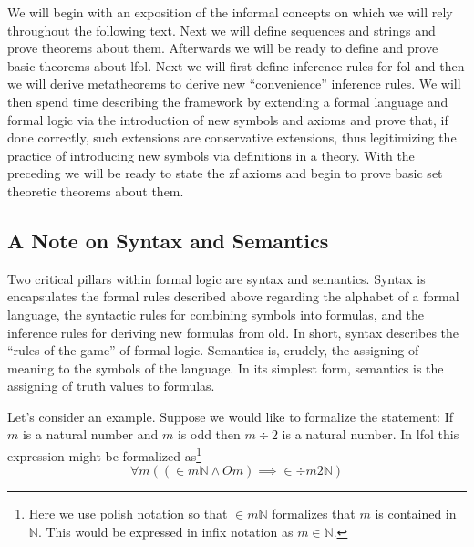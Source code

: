 \documentclass[12pt]{article}
\theoremstyle{break}
\theoremstyle{break}
\theoremstyle{break}
\theoremstyle{break}
\theoremstyle{break}
\newtheorem{informal definition}[definition]{Informal Definition}
\newcommand{\qq}[1]{``#1''}
\begin{document}
We will begin with an exposition of the informal concepts on which we will rely throughout the following text.
Next we will define sequences and strings and prove theorems about them.
Afterwards we will be ready to define and prove basic theorems about \gls{lfol}.
Next we will first define inference rules for \gls{fol} and then we will derive metatheorems to derive new \qq{convenience} inference rules.
We will then spend time describing the framework by extending a formal language and formal logic via the introduction of new symbols and axioms and prove that, if done correctly, such extensions are conservative extensions, thus legitimizing the practice of introducing new symbols via definitions in a theory.
With the preceding we will be ready to state the \gls{zf} axioms and begin to prove basic set theoretic theorems about them.

\subsection{A Note on Syntax and Semantics}

Two critical pillars within formal logic are syntax and semantics.
Syntax is encapsulates the formal rules described above regarding the alphabet of a formal language, the syntactic rules for combining symbols into formulas, and the inference rules for deriving new formulas from old.
In short, syntax describes the \qq{rules of the game} of formal logic.
Semantics is, crudely, the assigning of meaning to the symbols of the language.
In its simplest form, semantics is the assigning of truth values to formulas.

Let's consider an example.
Suppose we would like to formalize the statement: If $m$ is a natural number and $m$ is odd then $m \div 2$ is a natural number.
In \gls{lfol} this expression might be formalized as\footnote{Here we use polish notation so that $\in m \mathbb{N}$ formalizes that $m$ is contained in $\mathbb{N}$. This would be expressed in infix notation as $m\in \mathbb{N}$.}
\begin{equation*}
\forall m((\in m \mathbb{N} \land Om) \implies \in \div m 2 \mathbb{N})
\end{equation*}
\end{document}
